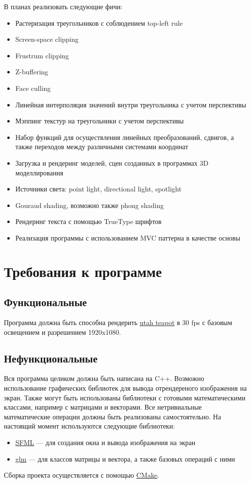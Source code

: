 \documentclass{article}
\begin{document}
В планах реализовать следующие фичи:
\begin{itemize}
    \item Растеризация треугольников с соблюдением top-left rule 
    \item Screen-space clipping
    \item Frustrum clipping
    \item Z-buffering
    \item Face culling
    \item Линейная интерполяция значений внутри треугольника с учетом перспективы
    \item Мэппинг текстур на треугольники с учетом перспективы
    \item Набор функций для осуществления линейных преобразований, сдвигов, а также 
    переходов между различными системами координат 
    \item Загрузка и рендеринг моделей, сцен созданных в программах 3D моделлирования 
    \item Источники света: point light, directional light, spotlight 
    \item Gouraud shading, возможно также phong shading
    \item Рендеринг текста с помощью TrueType шрифтов
    \item Реализация программы с использованием MVC паттерна в качестве основы
\end{itemize}

\section{Требования к программе}
\subsection*{Функциональные}
    Программа должна быть способна рендерить \href{https://en.wikipedia.org/wiki/Utah_teapot}{utah teapot} в 30 fps с 
    базовым освещением и разрешением 1920x1080.

\subsection*{Нефункциональные}
Вся программа целиком должна быть написана на C++. Возможно 
использование графических библиотек для вывода отрендереного изображения на экран.
Также могут быть использованы библиотеки с готовыми математическими классами, например с матрицами 
и векторами. Все нетривиальные математические операции должны быть реализованы самостоятельно. 
На настоящий момент используются следующие библиотеки:
\begin{itemize}
    \item \href{https://www.sfml-dev.org/index.php}{SFML} --- для создания окна и вывода изображения на экран 
    \item \href{https://github.com/g-truc/glm}{glm} --- для классов матрицы и вектора, а также базовых 
    операций с ними
\end{itemize}
Сборка проекта осуществляется с помощью \href{https://cmake.org/}{CMake}.
\end{document}
